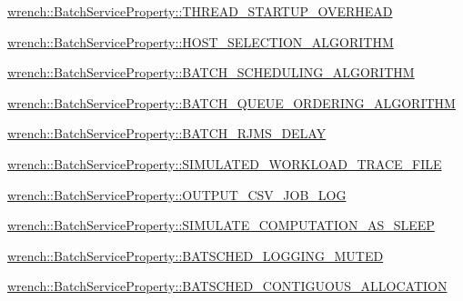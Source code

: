 \begin{DoxyItemize}
\item {\ttfamily \hyperlink{classwrench_1_1_batch_service_property_ad60a71526e251e20cbd871e5d30e5023}{wrench\+::\+Batch\+Service\+Property\+::\+T\+H\+R\+E\+A\+D\+\_\+\+S\+T\+A\+R\+T\+U\+P\+\_\+\+O\+V\+E\+R\+H\+E\+AD}}
\item {\ttfamily \hyperlink{classwrench_1_1_batch_service_property_af75bbbe70a733d3a65cddc5c57b0b441}{wrench\+::\+Batch\+Service\+Property\+::\+H\+O\+S\+T\+\_\+\+S\+E\+L\+E\+C\+T\+I\+O\+N\+\_\+\+A\+L\+G\+O\+R\+I\+T\+HM}}
\item {\ttfamily \hyperlink{classwrench_1_1_batch_service_property_aceb0af1c33f5ff2da347f54a484ce32e}{wrench\+::\+Batch\+Service\+Property\+::\+B\+A\+T\+C\+H\+\_\+\+S\+C\+H\+E\+D\+U\+L\+I\+N\+G\+\_\+\+A\+L\+G\+O\+R\+I\+T\+HM}}
\item {\ttfamily \hyperlink{classwrench_1_1_batch_service_property_a51cc79b2c963a67dac5685fbba4e5a9f}{wrench\+::\+Batch\+Service\+Property\+::\+B\+A\+T\+C\+H\+\_\+\+Q\+U\+E\+U\+E\+\_\+\+O\+R\+D\+E\+R\+I\+N\+G\+\_\+\+A\+L\+G\+O\+R\+I\+T\+HM}}
\item {\ttfamily \hyperlink{classwrench_1_1_batch_service_property_a685c9784445ed28adbe43f69ccb98249}{wrench\+::\+Batch\+Service\+Property\+::\+B\+A\+T\+C\+H\+\_\+\+R\+J\+M\+S\+\_\+\+D\+E\+L\+AY}}
\item {\ttfamily \hyperlink{classwrench_1_1_batch_service_property_a6a7fb4d9f505cc29f7236ea3e5713f34}{wrench\+::\+Batch\+Service\+Property\+::\+S\+I\+M\+U\+L\+A\+T\+E\+D\+\_\+\+W\+O\+R\+K\+L\+O\+A\+D\+\_\+\+T\+R\+A\+C\+E\+\_\+\+F\+I\+LE}}
\item {\ttfamily \hyperlink{classwrench_1_1_batch_service_property_a0757979b1512be80fda90cbab946b51f}{wrench\+::\+Batch\+Service\+Property\+::\+O\+U\+T\+P\+U\+T\+\_\+\+C\+S\+V\+\_\+\+J\+O\+B\+\_\+\+L\+OG}}
\item {\ttfamily \hyperlink{classwrench_1_1_batch_service_property_a0bde5c75f5f093ae15e68d67ae453ac3}{wrench\+::\+Batch\+Service\+Property\+::\+S\+I\+M\+U\+L\+A\+T\+E\+\_\+\+C\+O\+M\+P\+U\+T\+A\+T\+I\+O\+N\+\_\+\+A\+S\+\_\+\+S\+L\+E\+EP}}
\item {\ttfamily \hyperlink{classwrench_1_1_batch_service_property_aaab42384419440aacdbaac79e3346bf1}{wrench\+::\+Batch\+Service\+Property\+::\+B\+A\+T\+S\+C\+H\+E\+D\+\_\+\+L\+O\+G\+G\+I\+N\+G\+\_\+\+M\+U\+T\+ED}}
\item {\ttfamily \hyperlink{classwrench_1_1_batch_service_property_ac21c68a5a297ba00fc919cec0d90c18d}{wrench\+::\+Batch\+Service\+Property\+::\+B\+A\+T\+S\+C\+H\+E\+D\+\_\+\+C\+O\+N\+T\+I\+G\+U\+O\+U\+S\+\_\+\+A\+L\+L\+O\+C\+A\+T\+I\+ON}} 
\end{DoxyItemize}
